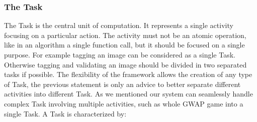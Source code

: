 \subsubsection{The Task}\label{data:task}
The Task is the central unit of computation. It represents a single activity
focusing on a particular action. The activity must not be an atomic operation,
like in an algorithm a single function call, but it should be focused on a
single purpose. For example tagging an image can be considered as a single Task.
Otherwise tagging and validating an image should be divided in two separated
tasks if possible. The flexibility of the framework allows the creation of any
type of Task, the previous statement is only an advice to better separate
different activities into different Task. As we mentioned our system can
seamlessly handle complex Task involving multiple activities, such as whole
\ac{GWAP} game into a single Task. A Task is characterized by:

